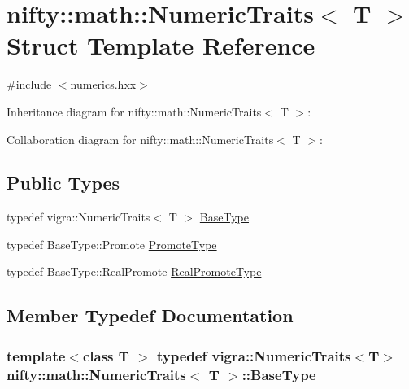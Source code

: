 \hypertarget{structnifty_1_1math_1_1NumericTraits}{}\section{nifty\+:\+:math\+:\+:Numeric\+Traits$<$ T $>$ Struct Template Reference}
\label{structnifty_1_1math_1_1NumericTraits}


{\ttfamily \#include $<$numerics.\+hxx$>$}



Inheritance diagram for nifty\+:\+:math\+:\+:Numeric\+Traits$<$ T $>$\+:


Collaboration diagram for nifty\+:\+:math\+:\+:Numeric\+Traits$<$ T $>$\+:
\subsection*{Public Types}
\begin{DoxyCompactItemize}
\item 
typedef vigra\+::\+Numeric\+Traits$<$ T $>$ \hyperlink{structnifty_1_1math_1_1NumericTraits_abccb0907651fb8a346015c6aad17077e}{Base\+Type}
\item 
typedef Base\+Type\+::\+Promote \hyperlink{structnifty_1_1math_1_1NumericTraits_a001a907b6cbeaaf29fb52ff31261e811}{Promote\+Type}
\item 
typedef Base\+Type\+::\+Real\+Promote \hyperlink{structnifty_1_1math_1_1NumericTraits_a5030d5141aa16424cd49d272306cd716}{Real\+Promote\+Type}
\end{DoxyCompactItemize}


\subsection{Member Typedef Documentation}
\hypertarget{structnifty_1_1math_1_1NumericTraits_abccb0907651fb8a346015c6aad17077e}{}
\subsubsection[{Base\+Type}]{\setlength{\rightskip}{0pt plus 5cm}template$<$class T $>$ typedef vigra\+::\+Numeric\+Traits$<$T$>$ {\bf nifty\+::math\+::\+Numeric\+Traits}$<$ T $>$\+::{\bf Base\+Type}}\label{structnifty_1_1math_1_1NumericTraits_abccb0907651fb8a346015c6aad17077e}
\hypertarget{structnifty_1_1math_1_1NumericTraits_a001a907b6cbeaaf29fb52ff31261e811}{}
